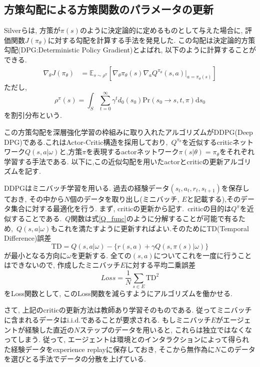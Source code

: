 \documentclass{jsarticle}
\newcommand{\expect}{\mathbb{E}}
\begin{document}
\subsection{方策勾配による方策関数のパラメータの更新}
Silverら\cite{DPG}は, 方策が$\pi(s)$のように決定論的に定めるものとして与えた場合に, 評価関数$J(\pi_{\theta})$に対する勾配を計算する手法を発見した. この勾配は決定論的方策勾配(DPG:Deterministic Policy Gradient)とよばれ, 以下のように計算することができる.
\begin{align}
	\nabla_{\theta}J(\pi_{\theta}) &= \expect_{s\sim\rho^{\pi}}[
	\nabla_{\theta}\pi_{\theta}(s)\nabla_{a}Q^{\pi_{\theta}}(s, a)|_{a=\pi_{\theta}(s)}] \label{true_pg} 
\end{align}
ただし, 
\begin{equation}
	\rho^{\pi}(s) = \int_{S}\sum_{t=0}^{\infty}\gamma^td_0(s_0)\textrm{Pr}(s_0\to s, t,  \pi)\textrm{d}s_0
\end{equation}
を割引分布という.\par
この方策勾配を深層強化学習の枠組みに取り入れたアルゴリズムがDDPG(Deep DPG)\cite{DDPG}である.これはActor-Critic構造を採用しており,~$Q^{\pi_{\theta}}$を近似するcriticネットワーク$Q(s,a|\omega)$と,方策$\pi$を表現するactorネットワーク$\pi(s|\theta)=\pi_{\theta}$をそれぞれ学習する手法である. 以下に,この近似勾配を用いたactorとcriticの更新アルゴリズムを記す.\par
DDPGはミニバッチ学習を用いる. 過去の経験データ$(s_t, a_t, r_t, s_{t+1})$を保存しておき, その中から$N$個のデータを取り出し(ミニバッチ, $E$と記載する),そのデータ集合に対する最適化を行う. まず, criticの更新から記す.~criticの目的は$Q^{\pi}$を近似することである.~$Q$関数は式\eqref{Q_func}のように分解することが可能で有るため,~$Q(s,a|\omega)$もこれを満たすように更新すればよい.そのためにTD(Temporal Difference)誤差
\begin{equation}
	\textrm{TD} = Q(s,a|\omega) - \{r(s,a)+\gamma Q(s,\pi(s)|\omega)\}
\end{equation}
が最小となる方向に$\omega$を更新する. 全ての$(s,a)$についてこれを一度に行うことはできないので, 作成したミニバッチ$E$に対する平均二乗誤差
\begin{equation}
	Loss = \frac{1}{N}\sum_{s\in E} \textrm{TD}^2
\end{equation}
をLoss関数として, このLoss関数を減らすようにアルゴリズムを働かせる. \par
さて, 上記のcriticの更新方法は教師あり学習そのものである. 従ってミニバッチに含まれるデータはi.i.d.であることが要求される. もしミニバッチ$E$がエージェントが経験した直近の$N$ステップのデータを用いると, これらは独立ではなくなってしまう. 従って, エージェントは環境とのインタラクションによって得られた経験データをexperience replayに保存しておき, そこから無作為に$N$このデータを選びとる手法でデータの分散を上げている.\par
\end{document}
